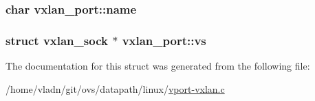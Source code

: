 \subsubsection[{name}]{\setlength{\rightskip}{0pt plus 5cm}char vxlan\+\_\+port\+::name}\label{structvxlan__port_a48b3eb83bbca17229480cf0d7a130272}
\hypertarget{structvxlan__port_a28d2b1a2a5beaaf48453d1e0628efb88}{}
\subsubsection[{vs}]{\setlength{\rightskip}{0pt plus 5cm}struct {\bf vxlan\+\_\+sock} $\ast$ vxlan\+\_\+port\+::vs}\label{structvxlan__port_a28d2b1a2a5beaaf48453d1e0628efb88}


The documentation for this struct was generated from the following file\+:\begin{DoxyCompactItemize}
\item 
/home/vladn/git/ovs/datapath/linux/\hyperlink{linux_2vport-vxlan_8c}{vport-\/vxlan.\+c}\end{DoxyCompactItemize}
